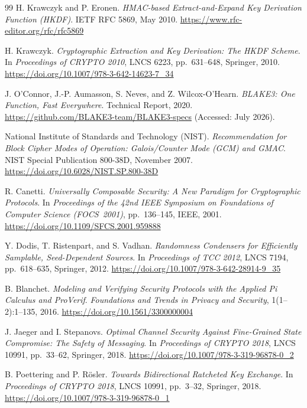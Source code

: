 \documentclass[11pt,a4paper]{article}
\theoremstyle{remark}
\theoremstyle{plain}
\begin{document}
\begin{thebibliography}{99}
H. Krawczyk and P. Eronen.
\emph{HMAC-based Extract-and-Expand Key Derivation Function (HKDF)}.
IETF RFC 5869, May 2010.
\url{https://www.rfc-editor.org/rfc/rfc5869}

H. Krawczyk.
\emph{Cryptographic Extraction and Key Derivation: The HKDF Scheme}.
In \emph{Proceedings of CRYPTO 2010}, LNCS 6223, pp.~631--648, Springer, 2010.
\url{https://doi.org/10.1007/978-3-642-14623-7_34}

J. O'Connor, J.-P. Aumasson, S. Neves, and Z. Wilcox-O'Hearn.
\emph{BLAKE3: One Function, Fast Everywhere}.
Technical Report, 2020.
\url{https://github.com/BLAKE3-team/BLAKE3-specs} (Accessed: July 2026).

National Institute of Standards and Technology (NIST).
\emph{Recommendation for Block Cipher Modes of Operation: Galois/Counter Mode (GCM) and GMAC}.
NIST Special Publication 800-38D, November 2007.
\url{https://doi.org/10.6028/NIST.SP.800-38D}

R. Canetti.
\emph{Universally Composable Security: A New Paradigm for Cryptographic Protocols}.
In \emph{Proceedings of the 42nd IEEE Symposium on Foundations of Computer Science (FOCS~2001)},
pp.~136--145, IEEE, 2001.
\url{https://doi.org/10.1109/SFCS.2001.959888}

Y. Dodis, T. Ristenpart, and S. Vadhan.
\emph{Randomness Condensers for Efficiently Samplable, Seed-Dependent Sources}.
In \emph{Proceedings of TCC 2012}, LNCS 7194, pp.~618--635, Springer, 2012.
\url{https://doi.org/10.1007/978-3-642-28914-9_35}

B. Blanchet.
\emph{Modeling and Verifying Security Protocols with the Applied Pi Calculus and ProVerif}.
\emph{Foundations and Trends in Privacy and Security}, 1(1--2):1--135, 2016.
\url{https://doi.org/10.1561/3300000004}

J. Jaeger and I. Stepanovs.
\emph{Optimal Channel Security Against Fine-Grained State Compromise: The Safety of Messaging}.
In \emph{Proceedings of CRYPTO 2018}, LNCS 10991, pp.~33--62, Springer, 2018.
\url{https://doi.org/10.1007/978-3-319-96878-0_2}

B. Poettering and P. R\"osler.
\emph{Towards Bidirectional Ratcheted Key Exchange}.
In \emph{Proceedings of CRYPTO 2018}, LNCS 10991, pp.~3--32, Springer, 2018.
\url{https://doi.org/10.1007/978-3-319-96878-0_1}


\end{thebibliography}
\end{document}
